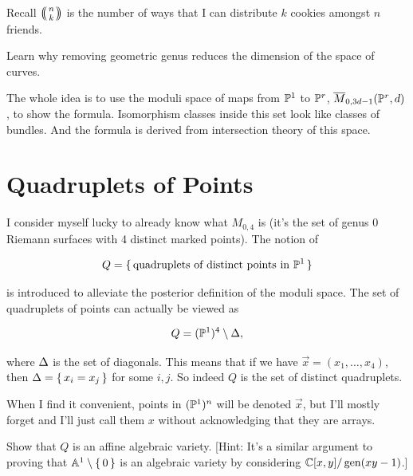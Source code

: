 \documentclass[12pt]{memoir}
\begin{document}
\begin{Rmk}
    Recall \(\multinom{n}{k}\) is the number of ways that I can distribute \(k\) cookies amongst \(n\) friends.
\end{Rmk}

\begin{Ej}
    Learn why removing geometric genus reduces the dimension of the space of curves.
\end{Ej}

\begin{ptcb}
\end{ptcb}

The whole idea is to use the moduli space of maps from \(\mathbb{P}^1\) to \(\mathbb{P}^r\), \(\overline M_{0,3d-1}(\mathbb{P}^r,d)\), to show the formula. Isomorphism classes inside this set look like classes of bundles. And the formula is derived from intersection theory of this space.

\section{Quadruplets of Points}

I consider myself lucky to already know what \(M_{0,4}\) is (it's the set of genus 0 Riemann surfaces with 4 distinct marked points). The notion of

\[Q=\{\,\text{quadruplets of distinct points in }\mathbb{P}^1\,\}\]

is introduced to alleviate the posterior definition of the moduli space. The set of quadruplets of points can actually be viewed as

\[Q=(\mathbb{P}^1)^4\setminus\Delta,\]

where \(\Delta\) is the set of diagonals. This means that if we have \(\vec x=(x_1,\dots,x_4)\), then \(\Delta=\{\,x_i=x_j\,\}\) for some \(i,j\). So indeed \(Q\) is the set of distinct quadruplets.

\begin{Rmk}
    When I find it convenient, points in \((\mathbb{P}^1)^n\) will be denoted \(\vec x\), but I'll mostly forget and I'll just call them \(x\) without acknowledging that they are arrays.
\end{Rmk}

\begin{Ej}
    Show that \(Q\) is an affine algebraic variety. [Hint: It's a similar argument to proving that \(\mathbb{A}^1\setminus\{\,0\,\}\) is an algebraic variety by considering \(\mathbb{C}[x,y]/\operatorname{gen}(xy-1)\).]
\end{Ej}
\end{document}

